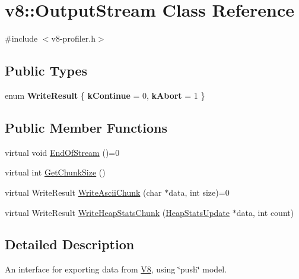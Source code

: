 \hypertarget{classv8_1_1OutputStream}{\section{v8\-:\-:Output\-Stream Class Reference}
\label{classv8_1_1OutputStream}
}


{\ttfamily \#include $<$v8-\/profiler.\-h$>$}

\subsection*{Public Types}
\begin{DoxyCompactItemize}
\item 
enum {\bfseries Write\-Result} \{ {\bfseries k\-Continue} =  0, 
{\bfseries k\-Abort} =  1
 \}
\end{DoxyCompactItemize}
\subsection*{Public Member Functions}
\begin{DoxyCompactItemize}
\item 
virtual void \hyperlink{classv8_1_1OutputStream_a6c5c308367fc5776bcbedff0e94d6049}{End\-Of\-Stream} ()=0
\item 
virtual int \hyperlink{classv8_1_1OutputStream_a93bdaa790cbd66a7283fad2cca3f48f7}{Get\-Chunk\-Size} ()
\item 
virtual Write\-Result \hyperlink{classv8_1_1OutputStream_a42adc62ebe43d00159f80328538f217f}{Write\-Ascii\-Chunk} (char $\ast$data, int size)=0
\item 
virtual Write\-Result \hyperlink{classv8_1_1OutputStream_a104fd1a0b5ef685e1d4967aaacbb9e9d}{Write\-Heap\-Stats\-Chunk} (\hyperlink{structv8_1_1HeapStatsUpdate}{Heap\-Stats\-Update} $\ast$data, int count)
\end{DoxyCompactItemize}


\subsection{Detailed Description}
An interface for exporting data from \hyperlink{classv8_1_1V8}{V8}, using \char`\"{}push\char`\"{} model. 

